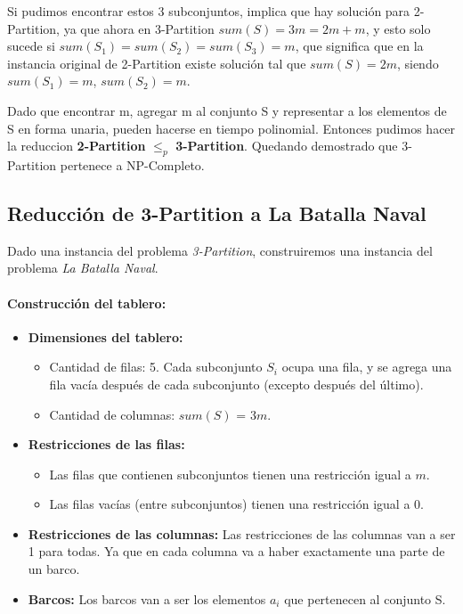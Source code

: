 Si pudimos encontrar estos 3 subconjuntos, implica que hay solución para 2-Partition, ya que ahora en 3-Partition $sum(S) = 3m = 2m + m$, y esto solo sucede si $sum(S_1) = sum(S_2) = sum(S_3) = m$, que significa que en la instancia original de 2-Partition existe solución tal que $sum(S) = 2m$, siendo $sum(S_1) = m$, $sum(S_2) = m$.

Dado que encontrar m, agregar m al conjunto S y representar a los elementos de S en forma unaria, pueden hacerse en tiempo polinomial. Entonces pudimos hacer la reduccion \textbf{2-Partition} $\leq_p$ \textbf{3-Partition}. Quedando demostrado que 3-Partition pertenece a NP-Completo.


\subsection*{Reducción de 3-Partition a La Batalla Naval}


Dado una instancia del problema \textit{3-Partition}, construiremos una instancia del problema \textit{La Batalla Naval}.

\paragraph{Construcción del tablero:}

\begin{itemize}
    \item \textbf{Dimensiones del tablero:} %
    \begin{itemize}
        \item Cantidad de filas: 5. Cada subconjunto \(S_i\) ocupa una fila, y se agrega una fila vacía después de cada subconjunto (excepto después del último).
        \item Cantidad de columnas: $sum(S)$ = \(3m\). %
    \end{itemize}

    \item \textbf{Restricciones de las filas:}
    \begin{itemize}
        \item Las filas que contienen subconjuntos tienen una restricción igual a $m$.
        \item Las filas vacías (entre subconjuntos) tienen una restricción igual a 0.
    \end{itemize}

    \item \textbf{Restricciones de las columnas:} Las restricciones de las columnas van a ser 1 para todas. Ya que en cada columna va a haber exactamente una parte de un barco.

    \item \textbf{Barcos:} Los barcos van a ser los elementos $a_i$ que pertenecen al conjunto S.
\end{itemize}

